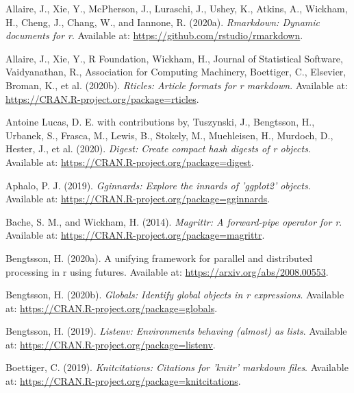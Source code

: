 \documentclass[utf8]{frontiersSCNS}
\newlength{\cslhangindent}
\newenvironment{cslreferences}%
  {\setlength{\parindent}{0pt}%
  \everypar{\setlength{\hangindent}{\cslhangindent}}\ignorespaces}%
  {\par}
\begin{document}
\hypertarget{refs}{}
\begin{cslreferences}
\leavevmode\hypertarget{ref-allaire2020rmarkdown}{}%
Allaire, J., Xie, Y., McPherson, J., Luraschi, J., Ushey, K., Atkins,
A., Wickham, H., Cheng, J., Chang, W., and Iannone, R. (2020a).
\emph{Rmarkdown: Dynamic documents for r}. Available at:
\url{https://github.com/rstudio/rmarkdown}.

\leavevmode\hypertarget{ref-allaire2020rticles}{}%
Allaire, J., Xie, Y., R Foundation, Wickham, H., Journal of Statistical
Software, Vaidyanathan, R., Association for Computing Machinery,
Boettiger, C., Elsevier, Broman, K., et al. (2020b). \emph{Rticles:
Article formats for r markdown}. Available at:
\url{https://CRAN.R-project.org/package=rticles}.

\leavevmode\hypertarget{ref-lucas2020digest}{}%
Antoine Lucas, D. E. with contributions by, Tuszynski, J., Bengtsson,
H., Urbanek, S., Frasca, M., Lewis, B., Stokely, M., Muehleisen, H.,
Murdoch, D., Hester, J., et al. (2020). \emph{Digest: Create compact
hash digests of r objects}. Available at:
\url{https://CRAN.R-project.org/package=digest}.

\leavevmode\hypertarget{ref-aphalo2019gginnards}{}%
Aphalo, P. J. (2019). \emph{Gginnards: Explore the innards of 'ggplot2'
objects}. Available at:
\url{https://CRAN.R-project.org/package=gginnards}.

\leavevmode\hypertarget{ref-bache2014magrittr}{}%
Bache, S. M., and Wickham, H. (2014). \emph{Magrittr: A forward-pipe
operator for r}. Available at:
\url{https://CRAN.R-project.org/package=magrittr}.

\leavevmode\hypertarget{ref-bengtsson2020unifying}{}%
Bengtsson, H. (2020a). A unifying framework for parallel and distributed
processing in r using futures. Available at:
\url{https://arxiv.org/abs/2008.00553}.

\leavevmode\hypertarget{ref-bengtsson2020globals}{}%
Bengtsson, H. (2020b). \emph{Globals: Identify global objects in r
expressions}. Available at:
\url{https://CRAN.R-project.org/package=globals}.

\leavevmode\hypertarget{ref-bengtsson2019listenv}{}%
Bengtsson, H. (2019). \emph{Listenv: Environments behaving (almost) as
lists}. Available at: \url{https://CRAN.R-project.org/package=listenv}.

\leavevmode\hypertarget{ref-boettiger2019knitcitations}{}%
Boettiger, C. (2019). \emph{Knitcitations: Citations for 'knitr'
markdown files}. Available at:
\url{https://CRAN.R-project.org/package=knitcitations}.


\end{cslreferences}
\end{document}
